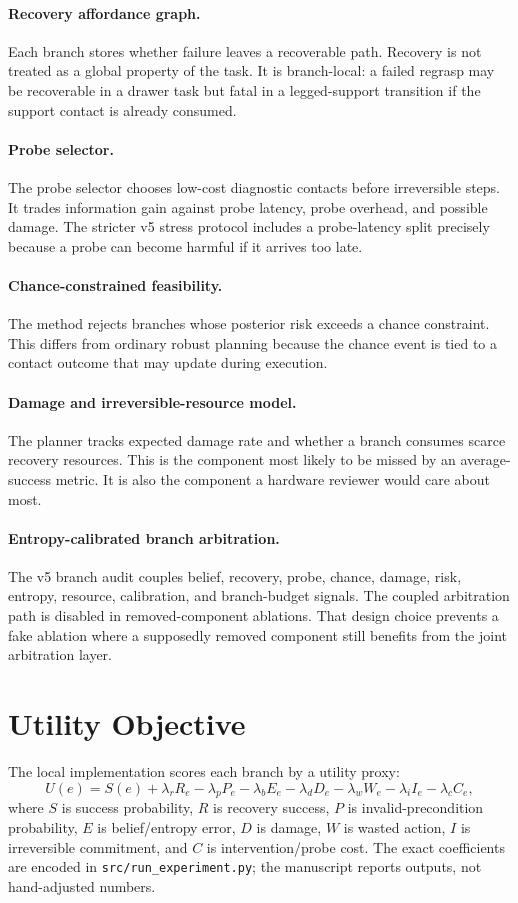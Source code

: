 \documentclass{article}
\begin{document}
\paragraph{Recovery affordance graph.}
Each branch stores whether failure leaves a recoverable path. Recovery is not treated as a global property of the task. It is branch-local: a failed regrasp may be recoverable in a drawer task but fatal in a legged-support transition if the support contact is already consumed.

\paragraph{Probe selector.}
The probe selector chooses low-cost diagnostic contacts before irreversible steps. It trades information gain against probe latency, probe overhead, and possible damage. The stricter v5 stress protocol includes a probe-latency split precisely because a probe can become harmful if it arrives too late.

\paragraph{Chance-constrained feasibility.}
The method rejects branches whose posterior risk exceeds a chance constraint. This differs from ordinary robust planning because the chance event is tied to a contact outcome that may update during execution.

\paragraph{Damage and irreversible-resource model.}
The planner tracks expected damage rate and whether a branch consumes scarce recovery resources. This is the component most likely to be missed by an average-success metric. It is also the component a hardware reviewer would care about most.

\paragraph{Entropy-calibrated branch arbitration.}
The v5 branch audit couples belief, recovery, probe, chance, damage, risk, entropy, resource, calibration, and branch-budget signals. The coupled arbitration path is disabled in removed-component ablations. That design choice prevents a fake ablation where a supposedly removed component still benefits from the joint arbitration layer.

\section{Utility Objective}
The local implementation scores each branch by a utility proxy:
\[
U(e)=S(e)+\lambda_r R_e-\lambda_p P_e-\lambda_b E_e-\lambda_d D_e-\lambda_w W_e-\lambda_i I_e-\lambda_c C_e,
\]
where $S$ is success probability, $R$ is recovery success, $P$ is invalid-precondition probability, $E$ is belief/entropy error, $D$ is damage, $W$ is wasted action, $I$ is irreversible commitment, and $C$ is intervention/probe cost. The exact coefficients are encoded in \texttt{src/run\_experiment.py}; the manuscript reports outputs, not hand-adjusted numbers.
\end{document}
